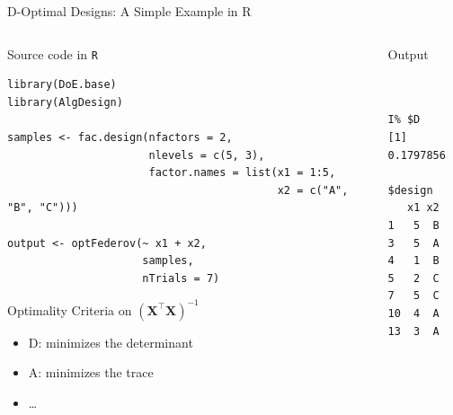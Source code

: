 \documentclass[10pt, compress, aspectratio=169, xcolor={table,usenames,dvipsnames}]{beamer}
\begin{document}
\begin{frame}[label={sec:org5d28bbe},fragile]{D-Optimal Designs: A Simple Example in R}
 \begin{columns}
\begin{column}{0.7\columnwidth}
\begin{block}{Source code in \texttt{R}}
\vspace{-.2cm}

\lstset{language=r,label= ,caption= ,captionpos=b,numbers=none}
\begin{lstlisting}
library(DoE.base)
library(AlgDesign)

samples <- fac.design(nfactors = 2,
                      nlevels = c(5, 3),
                      factor.names = list(x1 = 1:5,
                                          x2 = c("A", "B", "C")))

output <- optFederov(~ x1 + x2,
                     samples,
                     nTrials = 7)
\end{lstlisting}

\begin{block}{Optimality Criteria on \(\left(\bm{X}^{\intercal}\bm{X}\right)^{-1}\)}
\begin{itemize}
\item \alert{D}: minimizes the determinant
\item \alert{A}: minimizes the trace
\item \dots{}
\end{itemize}
\end{block}
\end{block}
\end{column}


\begin{column}{0.3\columnwidth}
\begin{block}{Output}
\vspace{-.2cm}
\scriptsize

\begin{verbatim}


I% $D
[1] 0.1797856

$design
   x1 x2
1   5  B
3   5  A
4   1  B
5   2  C
7   5  C
10  4  A
13  3  A
\end{verbatim}


\normalsize
\end{block}
\end{column}
\end{columns}
\end{frame}
\end{document}
